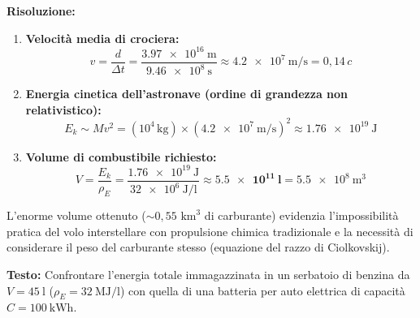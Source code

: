 \textbf{Risoluzione:}
\begin{enumerate}
    \item \textbf{Velocità media di crociera:}
    \begin{equation}
        v = \frac{d}{\Delta t} = \frac{\SI{3.97e16}{\metre}}{\SI{9.46e8}{\second}} \approx \SI{4.2e7}{\metre\per\second} = 0{,}14\,c
    \end{equation}
    \item \textbf{Energia cinetica dell'astronave (ordine di grandezza non relativistico):}
    \begin{equation}
        E_k \sim M v^2 = (10^4\,\si{\kilogram}) \times (\SI{4.2e7}{\metre\per\second})^2 \approx \SI{1.76e19}{\joule}
    \end{equation}
    \item \textbf{Volume di combustibile richiesto:}
    \begin{equation}
        V = \frac{E_k}{\rho_E} = \frac{\SI{1.76e19}{\joule}}{\SI{32e6}{\joule\per\litre}} \approx \mathbf{\SI{5.5e11}{\litre}} = \SI{5.5e8}{\metre\cubed}
    \end{equation}
\end{enumerate}
\begin{osservazione}
L'enorme volume ottenuto ($\sim 0{,}55\text{ km}^3$ di carburante) evidenzia l'impossibilità pratica del volo interstellare con propulsione chimica tradizionale e la necessità di considerare il peso del carburante stesso (equazione del razzo di Ciolkovskij).
\end{osservazione}

\begin{esercizio}
\textbf{Testo:}
Confrontare l'energia totale immagazzinata in un serbatoio di benzina da $V = \SI{45}{\litre}$ ($\rho_E = \SI{32}{\mega\joule\per\litre}$) con quella di una batteria per auto elettrica di capacità $C = \SI{100}{\kilo\watt\hour}$.
\end{esercizio}

